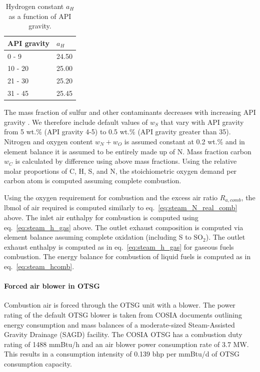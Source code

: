 \documentclass[11pt]{report}
\begin{document}
\begin{table}
\caption{Hydrogen constant $a_H$ as a function of API gravity.}
\label{tab:hydrogen_const}
\begin{scriptsize}
\begin{tabular*}{0.5\columnwidth}{p{}p{}}
\toprule
API gravity & $a_H$ \\
\midrule
0 - 9 & 24.50\\
10 - 20 & 25.00\\
21 - 30 & 25.20 \\
31 - 45 & 25.45 \\
\bottomrule
\end{tabular*}
\end{scriptsize}
\end{table}

The mass fraction of sulfur and other contaminants decreases with increasing API gravity \cite[Ch. 8, tables 3, 4]{speight1994} \cite[Ch. 7, tables 2, 3, and 19]{speight1994} \cite{swafford2009}. We therefore include default values of $w_S$ that vary with API gravity from 5 wt.\% (API gravity 4-5) to 0.5 wt.\% (API gravity greater than 35). Nitrogen and oxygen content $w_N + w_O$ is assumed constant at 0.2 wt.\% and in element balance it is assumed to be entirely made up of N. Mass fraction carbon $w_C$ is calculated by difference using above mass fractions. Using the relative molar proportions of C, H, S, and N, the stoichiometric oxygen demand per carbon atom is computed assuming complete combustion. 

Using the oxygen requirement for combustion and the excess air ratio $R_{a,comb}$, the lbmol of air required is computed similarly to eq.\ \eqref{eq:steam_N_real_comb} above. The inlet air enthalpy for combustion is computed using eq.\ \eqref{eq:steam_h_gas} above. The outlet exhaust composition is computed via element balance assuming complete oxidation (including S to SO$_2$). The outlet exhaust enthalpy is computed as in eq.\ \eqref{eq:steam_h_gas} for gaseous fuels combustion. The energy balance for combustion of liquid fuels is computed as in eq.\ \eqref{eq:steam_hcomb}.

\paragraph{Forced air blower in OTSG}

Combustion air is forced through the OTSG unit with a blower. The power rating of the default OTSG blower is taken from COSIA documents outlining energy consumption and mass balances of a moderate-sized Steam-Assisted Gravity Drainage (SAGD) facility.  The COSIA OTSG has a combustion duty rating of 1488 mmBtu/h and an air blower power consumption rate of 3.7 MW.  This results in a consumption intensity of 0.139 bhp per mmBtu/d of OTSG consumption capacity.
\end{document}
